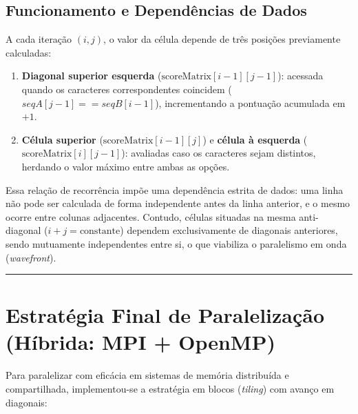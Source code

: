 \documentclass[12pt,a4paper]{article}
\begin{document}
\subsection*{Funcionamento e Dependências de Dados}
A cada iteração $(i, j)$, o valor da célula depende de três posições previamente calculadas:
\begin{enumerate}
    \item \textbf{Diagonal superior esquerda} ($\text{scoreMatrix}[i-1][j-1]$): acessada quando os caracteres correspondentes coincidem ($seqA[j-1] == seqB[i-1]$), incrementando a pontuação acumulada em $+1$.
    \item \textbf{Célula superior} ($\text{scoreMatrix}[i-1][j]$) e \textbf{célula à esquerda} ($\text{scoreMatrix}[i][j-1]$): avaliadas caso os caracteres sejam distintos, herdando o valor máximo entre ambas as opções.
\end{enumerate}

Essa relação de recorrência impõe uma dependência estrita de dados: uma linha não pode ser calculada de forma independente antes da linha anterior, e o mesmo ocorre entre colunas adjacentes. Contudo, células situadas na mesma anti-diagonal ($i + j = \text{constante}$) dependem exclusivamente de diagonais anteriores, sendo mutuamente independentes entre si, o que viabiliza o paralelismo em onda (\textit{wavefront}).

\vspace{0.5cm}
\hrule
\vspace{0.5cm}

\section{Estratégia Final de Paralelização (Híbrida: MPI + OpenMP)}

Para paralelizar com eficácia em sistemas de memória distribuída e compartilhada, implementou-se a estratégia em blocos (\textit{tiling}) com avanço em diagonais:
\end{document}
